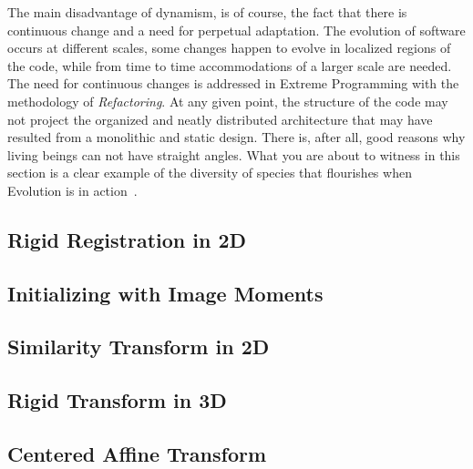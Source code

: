 The main disadvantage of dynamism, is of course, the fact that there is
continuous change and a need for perpetual adaptation. The evolution of
software occurs at different scales, some changes happen to evolve in localized
regions of the code, while from time to time accommodations of a larger scale
are needed. The need for continuous changes is addressed in Extreme Programming
with the methodology of \emph{Refactoring}. At any given point, the structure
of the code may not project the organized and neatly distributed architecture
that may have resulted from a monolithic and static design. There is, after
all, good reasons why living beings can not have straight angles. What you are
about to witness in this section is a clear example of the diversity of species
that flourishes when Evolution is in action~\cite{Darwin1999}.


\subsection{Rigid Registration in 2D}
\label{sec:RigidRegistrationIn2D}
\ifitkFullVersion

\fi

\subsection{Initializing with Image Moments}
\label{sec:InitializingRegistrationWithMoments}
\ifitkFullVersion

\fi



\subsection{Similarity Transform in 2D}
\label{sec:SimilarityRegistrationIn2D}
\ifitkFullVersion

\fi



\subsection{Rigid Transform in 3D}
\label{sec:RigidRegistrationIn3D}
\ifitkFullVersion

\fi




\subsection{Centered Affine Transform}
\label{sec:CenteredAffineTransform}
\ifitkFullVersion

\fi




